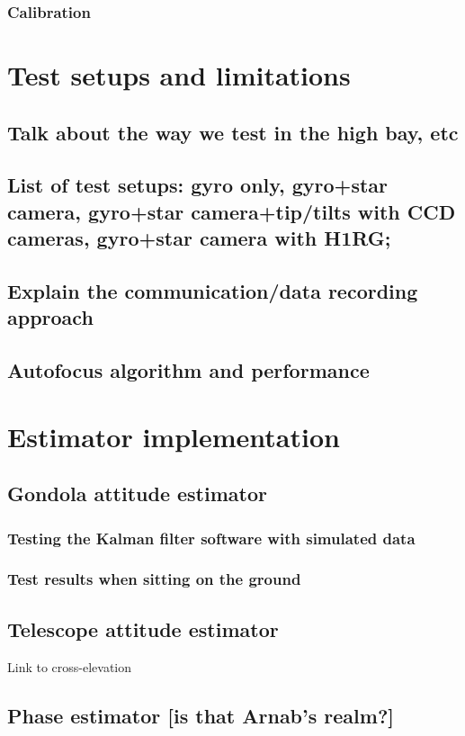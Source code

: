 \subsubsection{Calibration}

\section{Test setups and limitations}
\subsection{Talk about the way we test in the high bay, etc}
\subsection{List of test setups: gyro only, gyro+star camera, gyro+star camera+tip/tilts with CCD cameras, gyro+star camera with H1RG;}
\subsection{Explain the communication/data recording approach}




\subsection{Autofocus algorithm and performance}

\section{Estimator implementation}
\subsection{	Gondola attitude estimator}
\subsubsection{Testing the Kalman filter software with simulated data}
\subsubsection{Test results when sitting on the ground}
\subsection{Telescope attitude estimator}
Link to cross-elevation
\subsection{Phase estimator [is that Arnab’s realm?]}

